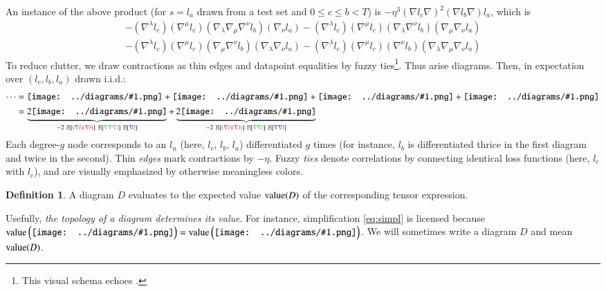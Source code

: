\documentclass{article}
\theoremstyle{plain}
\theoremstyle{definition}
\newtheorem{defn}{Definition}
\newcommand{\dvalue}{\text{\textnormal{value}}}
\newcommand{\expct}[1]{\mathbb{E}\left[#1\right]}
\newcommand{\wrap}[1]{\left(#1\right)}
\newcommand{\sdia}[1]{\begin{gathered}\texttt{[image: ../diagrams/\#1.png]}\end{gathered}}
\begin{document}
        An instance of the above product (for $s=l_a$ drawn from a test set and
        $0\leq c\leq b<T$) is $-\eta^3 (\nabla l_c \nabla)^2 (\nabla l_b
        \nabla) l_a$, which is
        {\small
        \begin{align*}
            - (\nabla^\lambda l_c) (\nabla^\mu l_c) (\nabla_\lambda \nabla_\mu \nabla^\nu l_b) (\nabla_\nu l_a)   
            - (\nabla^\lambda l_c) (\nabla^\mu l_c) (\nabla_\lambda \nabla^\nu l_b) (\nabla_\mu \nabla_\nu l_a) \\
            - (\nabla^\lambda l_c) (\nabla^\mu l_c) (\nabla_\mu \nabla^\nu l_b) (\nabla_\lambda \nabla_\nu l_a)   
            - (\nabla^\lambda l_c) (\nabla^\mu l_c) (\nabla^\nu l_b) (\nabla_\lambda \nabla_\mu \nabla_\nu l_a)
        \end{align*}
        }
        To reduce clutter, we draw contractions as thin edges and datapoint
        equalities by fuzzy ties\footnote{This visual schema echoes
        \citet{fe49, pe71}.}.  Thus arise diagrams.  Then, in expectation over
        $(l_c, l_b, l_a)$ drawn i.i.d.:
        \begin{align}
            \cdots
            &= 
                 \sdia{(01-2-3)(02-12-23)}
                +\sdia{(01-2-3)(02-13-23)}
                +\sdia{(01-2-3)(03-12-23)}
                +\sdia{(01-2-3)(03-13-23)} \\
                \label{eq:simpl}
            &=
                \underbrace{2\sdia{(01-2-3)(02-12-23)}}_{
                   -2~\expct{{\color{moor}(\nabla l)(\nabla l)}}~\expct{{\color{moog}\nabla\nabla\nabla l}}~\expct{{\color{moob} \nabla l}}
                }
                +
                \underbrace{2\sdia{(01-2-3)(02-13-23)}}_{
                   -2~\expct{{\color{moor}(\nabla l)(\nabla l)}}~\expct{{\color{moog}\nabla \nabla l}}~\expct{{\color{moob}\nabla \nabla l}}
                }
        \end{align}
        Each degree-$g$ node corresponds to an $l_n$ (here,
            {\color{moor} $l_c$},
            {\color{moog} $l_b$},
            {\color{moob} $l_a$}) differentiated $g$ times
        (for instance, {\color{moog} $l_b$} is differentiated thrice in the
        first diagram and twice in the second).  Thin \emph{edges} mark
        contractions by $-\eta$.  Fuzzy \emph{ties} denote correlations by
        connecting identical loss functions (here, {\color{moor} $l_c$} with
        {\color{moor} $l_c$}), and are visually emphasized by otherwise
        meaningless colors.
        \begin{defn}
            A diagram $D$ evaluates to the expected value
            $\dvalue(D)$ of the corresponding tensor expression.
        \end{defn}
        Usefully, %
        \emph{the topology of a diagram determines its value}.  For instance,
        simplification \ref{eq:simpl} is licensed because
        $
            \dvalue\wrap{\sdia{(01-2-3)(02-12-23)}}
            =
            \dvalue\wrap{\sdia{(01-2-3)(03-13-23)}}
        $.
        We will sometimes write a diagram $D$ and mean $\dvalue(D)$. 
    
\end{document}
